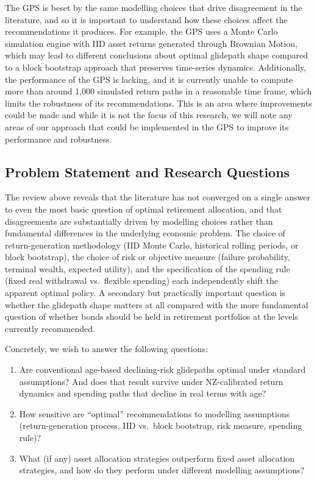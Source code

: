 \documentclass[11pt]{article}
\begin{document}
The GPS is beset by the same modelling choices that drive disagreement in the literature, and so it is important to understand how these choices affect the recommendations it produces. For example, the GPS uses a Monte Carlo simulation engine with IID asset returns generated through Brownian Motion, which may lead to different conclusions about optimal glidepath shape compared to a block bootstrap approach that preserves time-series dynamics. Additionally, the performance of the GPS is lacking, and it is currently unable to compute more than around 1,000 simulated return paths in a reasonable time frame, which limits the robustness of its recommendations. This is an area where improvements could be made and while it is not the focus of this research, we will note any areas of our approach that could be implemented in the GPS to improve its performance and robustness.


\subsection{Problem Statement and Research Questions}

The review above reveals that the literature has not converged on a single answer to even the most basic question of optimal retirement allocation, and that disagreements are substantially driven by modelling choices rather than fundamental differences in the underlying economic problem. The choice of return-generation methodology (IID Monte Carlo, historical rolling periods, or block bootstrap), the choice of risk or objective measure (failure probability, terminal wealth, expected utility), and the specification of the spending rule (fixed real withdrawal vs.\ flexible spending) each independently shift the apparent optimal policy. A secondary but practically important question is whether the glidepath shape matters at all compared with the more fundamental question of whether bonds should be held in retirement portfolios at the levels currently recommended.

Concretely, we wish to answer the following questions:
\begin{enumerate}
  \item Are conventional age-based declining-risk glidepaths optimal under standard assumptions? And does that result survive under NZ-calibrated return dynamics and spending paths that decline in real terms with age?
  \item How sensitive are ``optimal'' recommendations to modelling assumptions (return-generation process, IID vs.\ block bootstrap, risk measure, spending rule)?
  \item What (if any) asset allocation strategies outperform fixed asset allocation strategies, and how do they perform under different modelling assumptions?
\end{enumerate}
\end{document}

